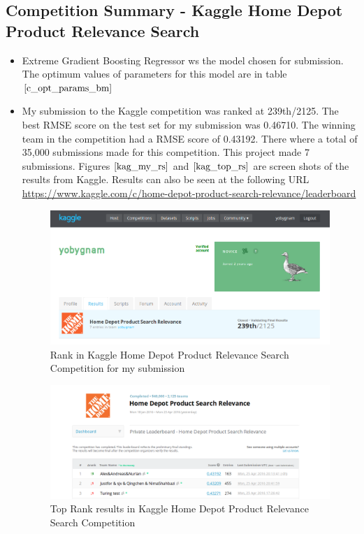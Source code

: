 \documentclass[twoside,12pt]{article}
\begin{document}
\subsection{Competition Summary - Kaggle Home Depot Product Relevance Search}
\label{kag_comp_res}
\begin{itemize}
\item
Extreme Gradient Boosting Regressor ws the model chosen for submission. The optimum values of parameters  for this model are in table $\eqref{c_opt_params_bm}$
\item
My submission to the Kaggle competition was ranked at 239th/2125.  The best RMSE score on the test set for my submission was 0.46710. The winning team in the competition had a RMSE score of 0.43192. There where a total of 35,000 submissions made for this competition. This project made 7 submissions. Figures $\eqref{kag_my_rs}$ and $\eqref{kag_top_rs}$ are screen shots of the results from Kaggle. Results can also be seen at the following URL \url{https://www.kaggle.com/c/home-depot-product-search-relevance/leaderboard}
\FloatBarrier
\begin{figure}[!htbp]
	\centering
	\includegraphics[scale=.43]{DataVisualization/kaggle_hd_aj_my_results.png} 
	\caption{Rank in Kaggle Home Depot Product Relevance Search Competition for my submission }
	\label{kag_my_rs}
\end{figure}

\FloatBarrier
\begin{figure}[!htbp]
	\centering
	\includegraphics[scale=.43]{DataVisualization/kaggle_hd_all_results.png} 
	\caption{Top Rank results in Kaggle Home Depot Product Relevance Search Competition}
	\label{kag_top_rs}
\end{figure}


\end{itemize}
\end{document}

